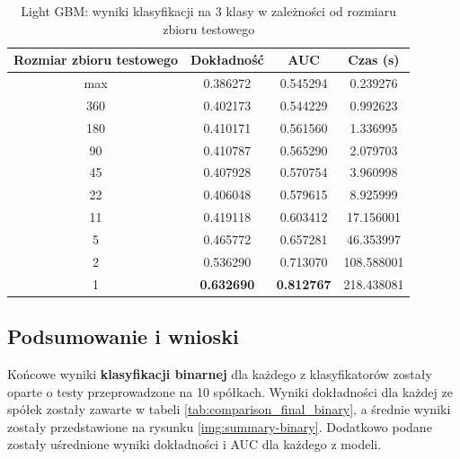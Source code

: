 \documentclass[a4paper, twoside, 11pt, openright]{article}
\begin{document}
\begin{table}[H]
    \centering
    \begin{tabular}{|c|c|c|c|}
    \hline
        \textbf{Rozmiar zbioru testowego} & \textbf{Dokładność} & \textbf{AUC} & \textbf{Czas (s)} \\ \hline
max   						 &  0.386272 &  0.545294 &    0.239276 \\ \hline
360                         &  0.402173 &  0.544229 &    0.992623 \\ \hline
180                         &  0.410171 &  0.561560 &    1.336995 \\ \hline
90                         &  0.410787 &  0.565290 &    2.079703 \\ \hline
45                          &  0.407928 &  0.570754 &    3.960998 \\ \hline
22                          &  0.406048 &  0.579615 &    8.925999 \\ \hline
11                          &  0.419118 &  0.603412 &   17.156001 \\ \hline
5                           &  0.465772 &  0.657281 &   46.353997 \\ \hline
2                           &  0.536290 &  0.713070 &  108.588001 \\ \hline
1                           &  \textbf{0.632690} &  \textbf{0.812767} &  218.438081 \\ \hline
    \end{tabular}
    \caption{Light GBM: wyniki klasyfikacji na 3 klasy w zależności od rozmiaru zbioru testowego}
    \label{tab:lgbm_walk_forward_discrete}
\end{table}

\subsection{Podsumowanie i wnioski}

Końcowe wyniki \textbf{klasyfikacji binarnej} dla każdego z klasyfikatorów zostały oparte o testy przeprowadzone na 10 spółkach. Wyniki dokładności dla każdej ze spółek zostały zawarte w tabeli \ref{tab:comparison_final_binary}, a średnie wyniki zostały przedstawione na rysunku \ref{img:summary-binary}. Dodatkowo podane zostały uśrednione wyniki dokładności i AUC dla każdego z modeli. 
\end{document}
